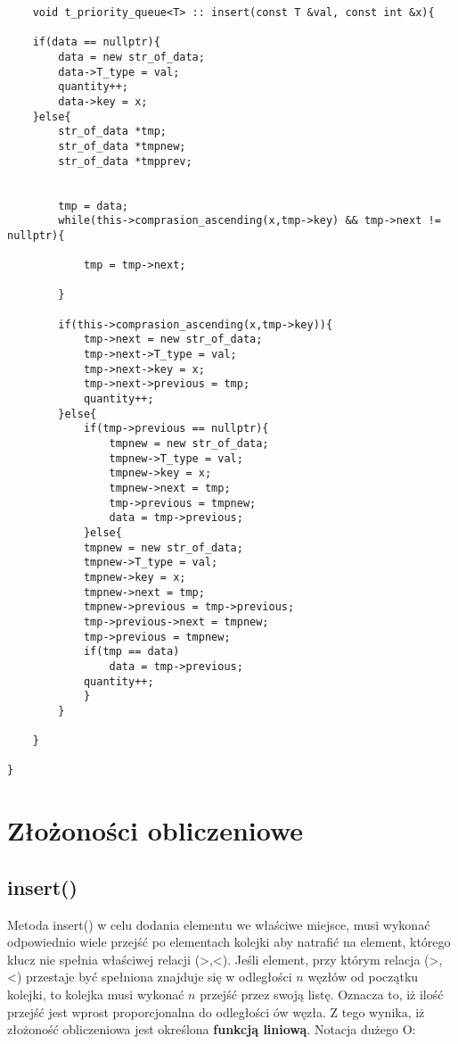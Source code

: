 \documentclass[12pt]{article}
\begin{document}
\begin{lstlisting}
    void t_priority_queue<T> :: insert(const T &val, const int &x){

    if(data == nullptr){
        data = new str_of_data;
        data->T_type = val;
        quantity++;
        data->key = x;
    }else{
        str_of_data *tmp;
        str_of_data *tmpnew;
        str_of_data *tmpprev;
        

        tmp = data;
        while(this->comprasion_ascending(x,tmp->key) && tmp->next != nullptr){

            tmp = tmp->next;

        }

        if(this->comprasion_ascending(x,tmp->key)){
            tmp->next = new str_of_data;
            tmp->next->T_type = val;
            tmp->next->key = x;
            tmp->next->previous = tmp;
            quantity++;
        }else{
            if(tmp->previous == nullptr){
                tmpnew = new str_of_data;
                tmpnew->T_type = val;
                tmpnew->key = x;
                tmpnew->next = tmp;
                tmp->previous = tmpnew;
                data = tmp->previous;
            }else{
            tmpnew = new str_of_data;
            tmpnew->T_type = val;
            tmpnew->key = x;
            tmpnew->next = tmp;
            tmpnew->previous = tmp->previous;
            tmp->previous->next = tmpnew;
            tmp->previous = tmpnew;
            if(tmp == data)
                data = tmp->previous;
            quantity++;
            }
        }        
        
    }

}
\end{lstlisting}


\section{Złożoności obliczeniowe}

\subsection{insert()}

\begin{figure}[H]
    \centering
    
\end{figure}

Metoda insert() w celu dodania elementu we właściwe miejsce, musi wykonać odpowiednio wiele przejść po elementach kolejki 
aby natrafić na element, którego klucz nie spełnia właściwej relacji (>,<). Jeśli element, przy którym relacja (>,<)
przestaje być spełniona znajduje się w odległości $n$ węzłów od początku kolejki, to kolejka musi wykonać $n$ przejść 
przez swoją listę. Oznacza to, iż ilość przejść jest wprost proporcjonalna do odległości ów węzła. Z tego wynika, iż
złożoność obliczeniowa jest określona \textbf{funkcją liniową}. Notacja dużego O:
\end{document}
